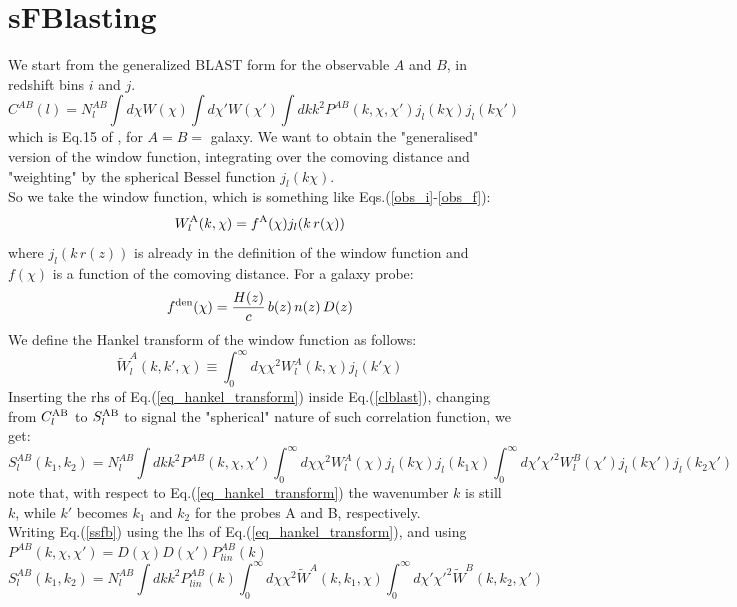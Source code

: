 \section{sFBlasting}
We start from the generalized BLAST form for the observable $A$ and $B$, in redshift bins $i$ and $j$. 
\begin{equation}
\label{clblast}    
C^{AB}(l) = N_l^{AB} \int d\chi W(\chi) \int d\chi' W(\chi') \int dk k^2 P^{AB}(k,\chi,\chi') j_l(k\chi) j_l(k\chi')
\end{equation}
which is Eq.15 of \cite{Chiarenza_et_al_2024}, for $A = B =$ galaxy. 
We want to obtain the "generalised" version of the window function, integrating over the comoving distance and "weighting" by the spherical Bessel function $j_l(k\chi)$. \\
So we take the window function, which is something like Eqs.(\ref{obs_i}-\ref{obs_f}):
\begin{equation}
    W^{\rm A}_l(k,\chi)  = f^{\rm A}(\chi) j_l(k\,r(\chi))
\end{equation}
where $j_l(k\,r(z))$ is already in the definition of the window function and $f(\chi)$ is a function of the comoving distance. For a galaxy probe:
\begin{equation}
    f^{\rm den}(\chi) = \frac{H(z)}c\,b(z)\,n(z)\,D(z)
\end{equation}
We define the Hankel transform of the window function as follows:
\begin{equation}
\label{eq_hankel_transform}
\widetilde{W}_l^{A}(k,k',\chi) \equiv \int_0^{\infty} d\chi \chi^2 W_{l}^{A}(k,\chi) j_l(k' \chi)
\end{equation}
Inserting the rhs of Eq.(\ref{eq_hankel_transform}) inside Eq.(\ref{clblast}), changing from $C^{\rm AB}_l$ to $S^{\rm AB}_l$ to signal the "spherical" nature of such correlation function, we get:
\begin{equation}
\label{ssfb}
S_l^{AB}(k_1,k_2) = N_l^{AB} \int dk k^2 P^{AB}(k,\chi,\chi') \int_0^{\infty} d\chi  \chi^2 W_{l}^A(\chi) j_l(k\chi) j_l(k_1 \chi) \int_0^{\infty} d\chi'  \chi'^2 W_{l}^B(\chi') j_l(k\chi')j_l(k_2 \chi')
\end{equation}
note that, with respect to Eq.(\ref{eq_hankel_transform}) the wavenumber $k$ is still $k$, while $k'$ becomes $k_1$ and $k_2$ for the probes A and B, respectively. \\
Writing Eq.(\ref{ssfb}) using the lhs of Eq.(\ref{eq_hankel_transform}), and using $P^{AB}(k,\chi,\chi') = D(\chi) D(\chi') P_{lin}^{AB}(k)$
\begin{equation}
\label{ssfb_new}
S_l^{AB}(k_1,k_2) = N_l^{AB} \int dk k^2 P_{lin}^{AB}(k) \int_0^{\infty} d\chi  \chi^2 \widetilde{W}^A(k,k_1,\chi) \int_0^{\infty} d\chi'  \chi'^2 \widetilde{W}^B(k,k_2,\chi')
\end{equation}
